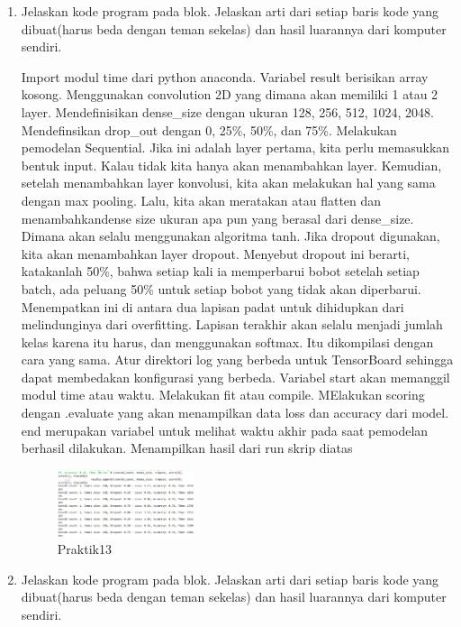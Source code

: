 \begin{enumerate}
\item Jelaskan kode program pada blok. Jelaskan arti dari setiap baris kode yang dibuat(harus beda dengan teman sekelas) dan hasil luarannya dari komputer sendiri.

Import modul time dari python anaconda. Variabel result berisikan array kosong. Menggunakan convolution 2D yang dimana akan memiliki 1 atau 2 layer. Mendefinisikan dense\_size dengan ukuran 128, 256, 512, 1024, 2048. Mendefinsikan drop\_out dengan 0, 25\%, 50\%, dan 75\%. Melakukan pemodelan Sequential. Jika ini adalah layer pertama, kita perlu memasukkan bentuk input. Kalau tidak kita hanya akan menambahkan layer. Kemudian, setelah menambahkan layer konvolusi, kita akan melakukan hal yang sama dengan max pooling. Lalu, kita akan meratakan atau flatten dan menambahkandense size ukuran apa pun yang berasal dari dense\_size. Dimana akan selalu menggunakan algoritma tanh. Jika dropout digunakan, kita akan menambahkan layer dropout. Menyebut dropout ini berarti, katakanlah 50\%, bahwa setiap kali ia memperbarui bobot setelah setiap batch, ada peluang 50\% untuk setiap bobot yang tidak akan diperbarui. Menempatkan ini di antara dua lapisan padat untuk dihidupkan dari melindunginya dari overfitting. Lapisan terakhir akan selalu menjadi jumlah kelas karena itu harus, dan menggunakan softmax. Itu dikompilasi dengan cara yang sama. Atur direktori log yang berbeda untuk TensorBoard sehingga dapat membedakan konfigurasi yang berbeda. Variabel start akan memanggil modul time atau waktu. Melakukan fit atau compile. MElakukan scoring dengan .evaluate yang akan menampilkan data loss dan accuracy dari model. end merupakan variabel untuk melihat waktu akhir pada saat pemodelan berhasil dilakukan. Menampilkan hasil dari run skrip diatas



	\begin{figure}[H]
		\includegraphics[width=4cm]{figures/1174008/7/praktik13.PNG}
            	\centering
           	 \caption{Praktik13}
       	 \end{figure}

\item Jelaskan kode program pada blok. Jelaskan arti dari setiap baris kode yang dibuat(harus beda dengan teman sekelas) dan hasil luarannya dari komputer sendiri.


\end{enumerate}
